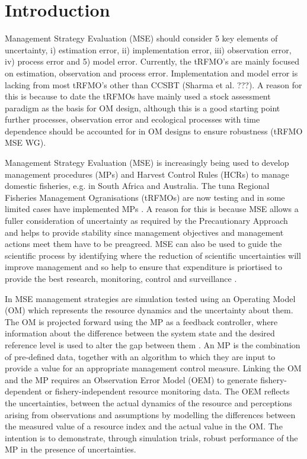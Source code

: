 \documentclass[%
nonumbib,      %
%
]{nrc1}                          %
\begin{document}
\section*{Introduction}

Management Strategy Evaluation (MSE) should consider 5 key elements of uncertainty, i) estimation error, ii) implementation error, iii) observation error, iv) process error and 5) model error. Currently, the tRFMO's are mainly focused on estimation, observation and process error. Implementation and model error is lacking from most tRFMO's other than CCSBT (Sharma et al. ???).  A reason for this is because to date the tRFMOs have mainly used a stock assessment paradigm as the basis for OM design, although this is a good starting point further processes, observation error and ecological processes with time dependence should be accounted for in OM designs to ensure robustness (tRFMO MSE WG). 


Management Strategy Evaluation (MSE) is increasingly being used to develop management procedures (MPs) and Harvest Control Rules (HCRs) to manage domestic fisheries, e.g. in South Africa and Australia. The tuna Regional Fisheries Management Ogranisations (tRFMOs) are now testing and in some limited cases have implemented MPs \citep{hillary2013sbthcr}. A reason for this is because MSE allows a fuller consideration of uncertainty as required by the Precautionary Approach \citep{garcia1996precautionary} and helps to provide stability since management objectives and management actions meet them have to be preagreed. MSE can also be used to guide the scientific process by identifying where the reduction of scientific uncertainties will improve management and so help to ensure that expenditure is priortised to provide the best research, monitoring, control  and surveillance \cite{fromentin2014spectre}. 

In MSE management strategies are simulation tested using an Operating Model (OM) which represents the resource dynamics and the uncertainty about them. The OM is projected forward using the MP as a feedback controller, where information about the difference between the system state and the desired reference level is used to alter the gap between them \citep{ramaprasad1983definition}. An MP is the combination of pre-defined data, together with an algorithm to which they are input to provide a value for an appropriate management control measure. Linking the OM and the MP requires an Observation Error Model (OEM) to generate fishery-dependent or fishery-independent resource monitoring data. The OEM reflects the uncertainties, between the actual dynamics of the resource and perceptions arising from observations and assumptions by modelling the differences between the measured value of a resource index and the actual value in the OM.  The intention is to demonstrate, through simulation trials, robust performance of the MP in the presence of uncertainties. 
\end{document}
